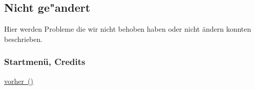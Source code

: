 %



\newpage



\subsection{Nicht ge{"a}ndert}
\label{Abschnitt:Aenderungen:Protokoll:Nicht_behobene_Probleme}

Hier werden Probleme die wir nicht behoben haben oder nicht ändern konnten beschrieben.





\subsubsection*{Startmenü, Credits}
\label{Abschnitt:Aenderungen:Protokoll:Startmenue}


\hyperref[Abb:Aenderungen:Startmenue_(vorher)]{vorher~(\mousecursor)}




